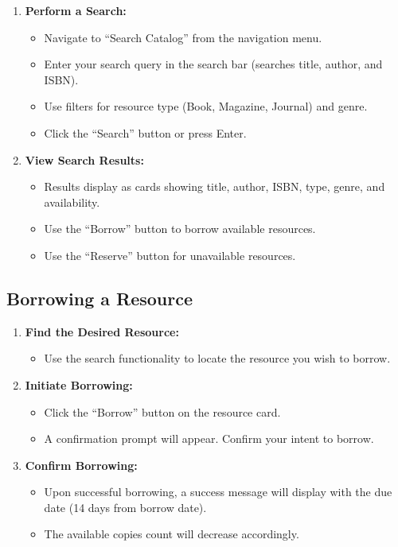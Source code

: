 \documentclass[11pt,a4paper]{article}
\begin{document}
\begin{enumerate}
    \item \textbf{Perform a Search:}
    \begin{itemize}
        \item Navigate to ``Search Catalog'' from the navigation menu.
        \item Enter your search query in the search bar (searches title, author, and ISBN).
        \item Use filters for resource type (Book, Magazine, Journal) and genre.
        \item Click the ``Search'' button or press Enter.
    \end{itemize}

    \item \textbf{View Search Results:}
    \begin{itemize}
        \item Results display as cards showing title, author, ISBN, type, genre, and availability.
        \item Use the ``Borrow'' button to borrow available resources.
        \item Use the ``Reserve'' button for unavailable resources.
    \end{itemize}
\end{enumerate}

\subsection{Borrowing a Resource}

\begin{enumerate}
    \item \textbf{Find the Desired Resource:}
    \begin{itemize}
        \item Use the search functionality to locate the resource you wish to borrow.
    \end{itemize}

    \item \textbf{Initiate Borrowing:}
    \begin{itemize}
        \item Click the ``Borrow'' button on the resource card.
        \item A confirmation prompt will appear. Confirm your intent to borrow.
    \end{itemize}

    \item \textbf{Confirm Borrowing:}
    \begin{itemize}
        \item Upon successful borrowing, a success message will display with the due date (14 days from borrow date).
        \item The available copies count will decrease accordingly.
    \end{itemize}
\end{enumerate}
\end{document}

